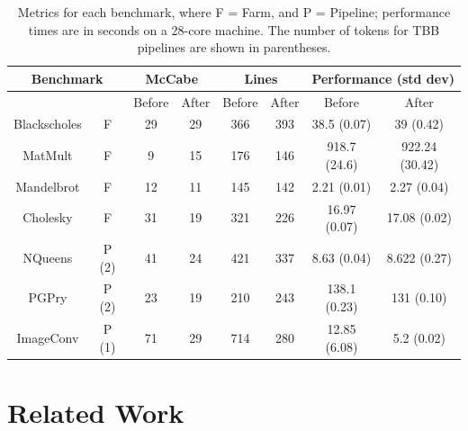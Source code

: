 
\begin{table}
	\begin{tabular}{|c|c|c|c|c|c|c|c|}
		\hline \hline
		\multicolumn{2}{|c|}{\textbf{Benchmark}} & \multicolumn{2}{|c|}{McCabe} & \multicolumn{2}{|c|}{Lines} & \multicolumn{2}{|c|}{Performance (std dev)}  \\
		\hline
		& & Before & After & Before & After & Before & After  \\
		\hline
		Blackscholes & F &  29 & 29 & 366 & 393 & 38.5 (0.07) & 39 (0.42)  \\
		MatMult & F & 9 & 15 & 176 & 146 & 918.7 (24.6) & 922.24 (30.42)  \\
		Mandelbrot & F  & 12 & 11 & 145 & 142 & 2.21 (0.01) & 2.27 (0.04) \\
		Cholesky & F & 31  & 19 & 321 & 226 & 16.97 (0.07) & 17.08 (0.02) \\
		NQueens & P (2) & 41 & 24 & 421 & 337 & 8.63 (0.04) & 8.622 (0.27) \\
		PGPry & P (2) & 23 & 19 & 210 & 243 & 138.1 (0.23) & 131 (0.10) \\
		ImageConv & P (1)  & 71 & 29 & 714 & 280 & 12.85 (6.08) & 5.2 (0.02)  \\
		\hline \hline
	\end{tabular}
	\caption{Metrics for each benchmark, where F = Farm, and P = Pipeline; performance times are in seconds on a 28-core machine. The number of tokens for TBB pipelines are shown in parentheses. }
	\label{fig:benchmarks2}
\end{table}

\section{Related Work}


